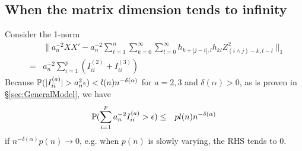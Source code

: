 \documentclass{article}
\begin{document}
\subsection{When the matrix dimension tends to infinity}
Consider the 1-norm
\begin{eqnarray*}
  && \| a_n^{-2} XX' - a_n^{-2} \sum_{t=1}^n
     \sum_{k=0}^\infty \sum_{l=0}^\infty
     h_{k+|j-i|,l} h_{kl} Z_{(i \wedge j) -k, t-l}^2\|_1 \\
  &=& a_n^{-2} \sum_{i=1}^p (I^{(2)}_{ii} + I^{(3)}_{ii})
\end{eqnarray*}
Because $\mathbb{P}(|I^{(a)}_{ii}| > a_n^2 \epsilon) < l(n)
n^{-\delta(\alpha)}$ for $a = 2,3$ and $\delta(\alpha) > 0$, as is
proven in \S\ref{sec:GeneralModel}, we have
\begin{eqnarray*}
  \mathbb{P}(\sum_{i=1}^p a_n^{-2} I^{(a)}_{ii} > \epsilon) &\leq& p l(n)
  n^{-\delta(\alpha)}
\end{eqnarray*}
if $n^{-\delta(\alpha)} p(n) \to 0$, e.g. when $p(n)$ is slowly varying, the RHS
tends to 0.


% 



\end{document}

